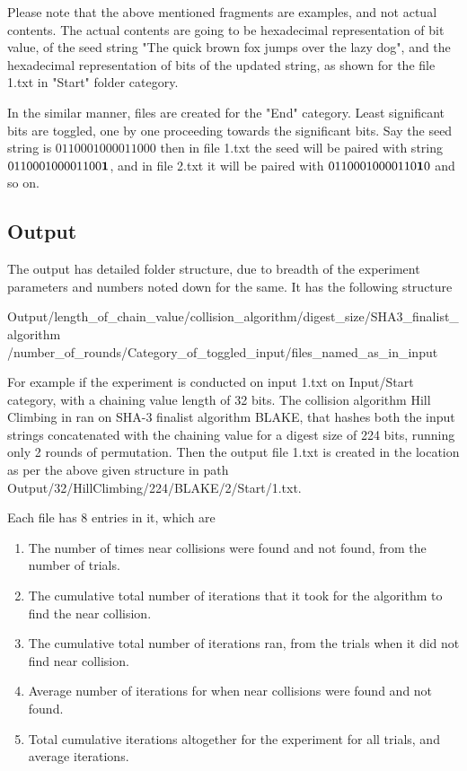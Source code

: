 Please note that the above mentioned fragments are examples, and not actual contents. The actual contents are going
to be hexadecimal representation of bit value, of the seed string "The quick brown fox jumps over the lazy dog", and 
the hexadecimal representation of bits of the updated string, as shown for the file 1.txt in "Start" folder category.

In the similar manner, files are created for the "End" category. Least significant bits are toggled, one by one
proceeding towards the significant bits. Say the seed string is $01100010 00011000$ then in file 1.txt the seed will
be paired with string $01100010 0001100{\bf 1}$, and in file 2.txt it will be paired with $01100010 000110{\bf 1}0$
and so on.

\subsection{Output}

The output has detailed folder structure, due to breadth of the experiment parameters and numbers noted down for
the same. It has the following structure
\begin{center}Output/length\_of\_chain\_value/collision\_algorithm/digest\_size/SHA3\_finalist\_algorithm
/number\_of\_rounds/Category\_of\_toggled\_input/files\_named\_as\_in\_input\end{center}

For example if the experiment is conducted on input 1.txt on Input/Start category, with a chaining value length of 
32 bits. The collision algorithm Hill Climbing in ran on SHA-3 finalist algorithm BLAKE, that hashes both the input 
strings concatenated with the chaining value for a digest size of 224 bits, running only 2 rounds of permutation.
Then the output file 1.txt is created in the location as per the above given structure in path 
Output/32/HillClimbing/224/BLAKE/2/Start/1.txt.

Each file has 8 entries in it, which are 
\begin{enumerate}
\item The number of times near collisions were found and not found, from the number of trials.
\item The cumulative total number of iterations that it took for the algorithm to find the near collision.
\item The cumulative total number of iterations ran, from the trials when it did not find near collision.
\item Average number of iterations for when near collisions were found and not found.
\item Total cumulative iterations altogether for the experiment for all trials, and average iterations.
\end{enumerate}

